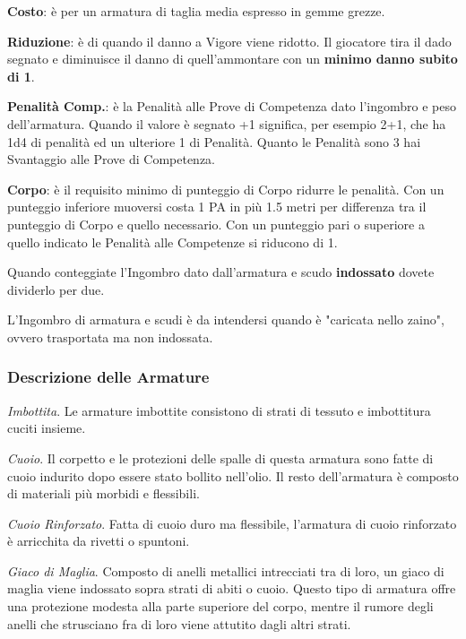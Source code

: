 \documentclass[12pt,a4paper,twoside,openany]{book}
\begin{document}
\begin{multicols}{2}

\textbf{Costo}: è per un armatura di taglia media espresso in gemme grezze.

\textbf{Riduzione}: è di quando il danno a Vigore viene ridotto. Il giocatore tira il dado segnato e diminuisce il danno di quell'ammontare con un \textbf{minimo danno subito di 1}.

\textbf{Penalità Comp.}: è la Penalità alle Prove di Competenza dato l'ingombro e peso dell'armatura. Quando il valore è segnato +1 significa, per esempio 2+1, che ha 1d4 di penalità ed un ulteriore 1 di Penalità. Quanto le Penalità sono 3 hai Svantaggio alle Prove di Competenza.

\textbf{Corpo}: è il requisito minimo di punteggio di Corpo ridurre le penalità. Con un punteggio inferiore muoversi costa 1 PA in più 1.5 metri per differenza tra il punteggio di Corpo e quello necessario. Con un punteggio pari o superiore a quello indicato le Penalità alle Competenze si riducono di 1.

\medskip

\begin{changemargin}{0.3cm}{0.3cm}\begin{narratore} Quando conteggiate l'Ingombro dato dall'armatura e scudo \textbf{indossato} dovete dividerlo per due.

L'Ingombro di armatura e scudi è da intendersi quando è "caricata nello zaino", ovvero trasportata ma non indossata.\end{narratore}\end{changemargin}

\subsubsection{Descrizione delle Armature}


\textit{Imbottita}. Le armature imbottite consistono di strati di tessuto e imbottitura cuciti insieme.

\textit{Cuoio}. Il corpetto e le protezioni delle spalle di questa armatura sono fatte di cuoio indurito dopo essere stato bollito nell'olio. Il resto dell'armatura è composto di
materiali più morbidi e flessibili.

\textit{Cuoio Rinforzato}. Fatta di cuoio duro ma flessibile, l'armatura di cuoio rinforzato è arricchita da rivetti o spuntoni.

\textit{Giaco di Maglia}. Composto di anelli metallici intrecciati tra di loro, un giaco di maglia viene indossato sopra strati di abiti o cuoio. Questo tipo di armatura offre una protezione modesta alla parte superiore del corpo, mentre il rumore degli anelli che strusciano fra di loro viene attutito dagli altri strati.


\end{multicols}
\end{document}
